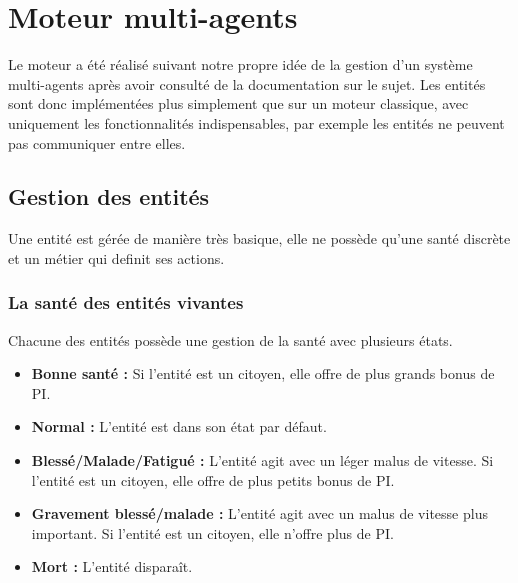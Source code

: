 \documentclass[a4paper]{memoir}
\begin{document}
		\section{Moteur multi-agents}
			Le moteur a été réalisé suivant notre propre idée de la gestion d'un système multi-agents après avoir consulté de la documentation sur le sujet. 
			Les entités sont donc implémentées plus simplement que sur un moteur classique, avec uniquement les fonctionnalités indispensables, par exemple les entités ne peuvent pas communiquer entre elles.
			
			\subsection{Gestion des entités}
				Une entité est gérée de manière très basique, elle ne possède qu'une santé discrète et un métier qui definit ses actions.
				
				\subsubsection{La santé des entités vivantes}
					Chacune des entités possède une gestion de la santé avec plusieurs états.
					\begin{itemize}[label=$\bullet$]
						\item \textbf{Bonne santé :} Si l'entité est un citoyen, elle offre de plus grands bonus de PI.
						\item \textbf{Normal :} L'entité est dans son état par défaut.
						\item \textbf{Blessé/Malade/Fatigué :} L'entité agit avec un léger malus de vitesse. Si l'entité est un citoyen, elle offre de plus petits bonus de PI.
						\item \textbf{Gravement blessé/malade :} L'entité agit avec un malus de vitesse plus important. Si l'entité est un citoyen, elle n'offre plus de PI.
						\item \textbf{Mort :} L'entité disparaît.
					\end{itemize}
					
\end{document}
